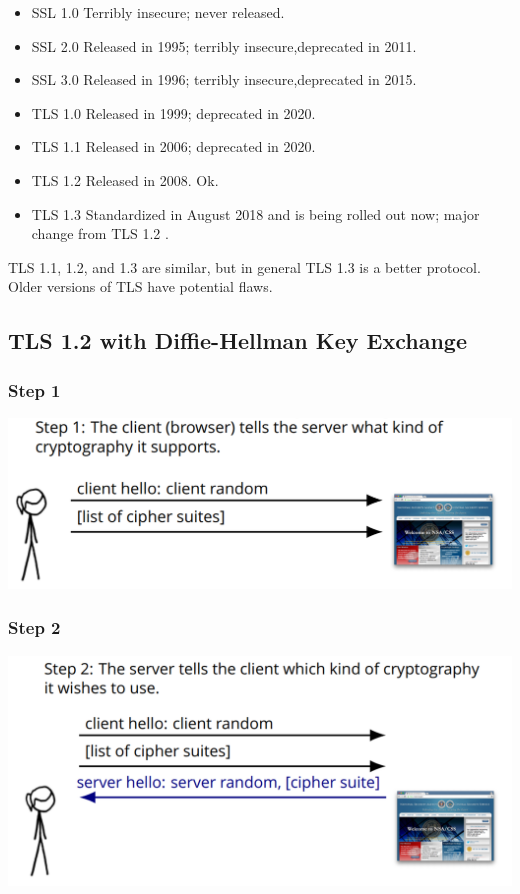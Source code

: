 \documentclass[11pt]{article} %
\begin{document}
\begin{itemize}
\item SSL 1.0 Terribly insecure; never released.
\item SSL 2.0 Released in 1995; terribly insecure,deprecated in 2011.
\item SSL 3.0  Released in 1996; terribly insecure,deprecated in 2015.
\item TLS 1.0 Released in 1999; deprecated in 2020. 
\item TLS 1.1 Released in 2006; deprecated in 2020.
\item TLS 1.2 Released in 2008. Ok.
\item TLS 1.3 Standardized in August 2018 and is being rolled out now;  major change from TLS 1.2 .
\end{itemize}
TLS 1.1, 1.2,  and 1.3 are similar, but in general TLS 1.3 is a better protocol. Older versions of TLS have potential flaws.

\newpage
\subsection{TLS 1.2 with Diffie-Hellman Key Exchange}

\subsubsection{Step 1}
\begin{center}
	\includegraphics[scale=.5]{./DiffieStep1.png}
\end{center}

\subsubsection{Step 2}
\begin{center}
	\includegraphics[scale=.5]{./DiffieStep2.png}
\end{center}
\end{document}
